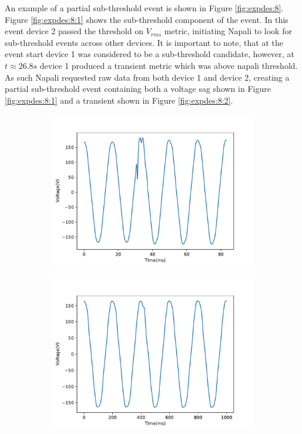 An example of a partial sub-threshold event is shown in Figure \ref{fig:expdes:8}.
Figure \ref{fig:expdes:8:1} shows the sub-threshold component of the event.
In this event device 2 passed the threshold on $V_{rms}$ metric, initiating Napali to look for sub-threshold events across other devices.
It is important to note, that at the event start device 1 was considered to be a sub-threshold candidate, however, at $t \approx 26.8s$ device 1 produced a transient metric which was above napali threshold.
As such Napali requested raw data from both device 1 and device 2, creating a partial sub-threshold event containing both a voltage sag shown in Figure \ref{fig:expdes:8:1} and a transient shown in Figure \ref{fig:expdes:8:2}.

\begin{figure}[h]
    \centering
    \begin{subfigure}{0.49\textwidth}
        \centering
        \includegraphics[width=1\linewidth]{img/napali_eval/raw_gridwide_sub_full1.pdf}
        \caption{}
        \label{fig:expdes:9:1}
    \end{subfigure}%
    \begin{subfigure}{0.49\textwidth}
        \centering
        \includegraphics[width=1\linewidth]{img/napali_eval/raw_gridwide_sub_full2.pdf}
        \caption{}
        \label{fig:expdes:9:2}
    \end{subfigure}


\end{figure}
